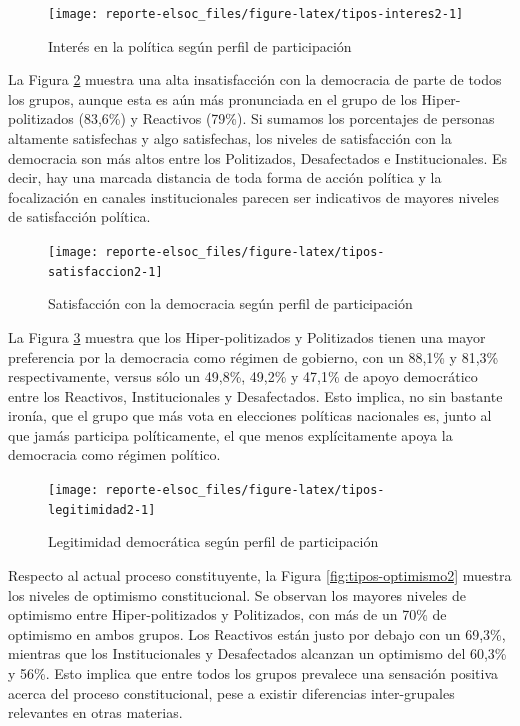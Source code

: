 \documentclass[
  12pt,
]{book}
\begin{document}
\begin{figure}

{\centering \texttt{[image: reporte-elsoc\_files/figure-latex/tipos-interes2-1]} 

}

\caption{Interés en la política según perfil de participación}\label{fig:tipos-interes2}
\end{figure}

La Figura \ref{fig:tipos-satisfaccion2} muestra una alta insatisfacción con la democracia de parte de todos los grupos, aunque esta es aún más pronunciada en el grupo de los Hiper-politizados (83,6\%) y Reactivos (79\%). Si sumamos los porcentajes de personas altamente satisfechas y algo satisfechas, los niveles de satisfacción con la democracia son más altos entre los Politizados, Desafectados e Institucionales. Es decir, hay una marcada distancia de toda forma de acción política y la focalización en canales institucionales parecen ser indicativos de mayores niveles de satisfacción política.

\begin{figure}

{\centering \texttt{[image: reporte-elsoc\_files/figure-latex/tipos-satisfaccion2-1]} 

}

\caption{Satisfacción con la democracia según perfil de participación}\label{fig:tipos-satisfaccion2}
\end{figure}

La Figura \ref{fig:tipos-legitimidad2} muestra que los Hiper-politizados y Politizados tienen una mayor preferencia por la democracia como régimen de gobierno, con un 88,1\% y 81,3\% respectivamente, versus sólo un 49,8\%, 49,2\% y 47,1\% de apoyo democrático entre los Reactivos, Institucionales y Desafectados. Esto implica, no sin bastante ironía, que el grupo que más vota en elecciones políticas nacionales es, junto al que jamás participa políticamente, el que menos explícitamente apoya la democracia como régimen político.

\begin{figure}

{\centering \texttt{[image: reporte-elsoc\_files/figure-latex/tipos-legitimidad2-1]} 

}

\caption{Legitimidad democrática según perfil de participación}\label{fig:tipos-legitimidad2}
\end{figure}

Respecto al actual proceso constituyente, la Figura \ref{fig:tipos-optimismo2} muestra los niveles de optimismo constitucional. Se observan los mayores niveles de optimismo entre Hiper-politizados y Politizados, con más de un 70\% de optimismo en ambos grupos. Los Reactivos están justo por debajo con un 69,3\%, mientras que los Institucionales y Desafectados alcanzan un optimismo del 60,3\% y 56\%. Esto implica que entre todos los grupos prevalece una sensación positiva acerca del proceso constitucional, pese a existir diferencias inter-grupales relevantes en otras materias.
\end{document}
